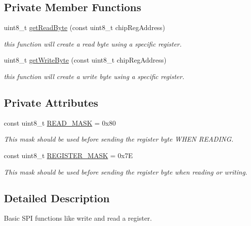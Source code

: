 \subsection*{Private Member Functions}
\begin{DoxyCompactItemize}
\item 
uint8\+\_\+t \mbox{\hyperlink{classspi_bus_a6e5f0193b056b4b58db49e1c6ce5d807}{get\+Read\+Byte}} (const uint8\+\_\+t chip\+Reg\+Address)
\begin{DoxyCompactList}\small\item\em this function will create a read byte using a specific register. \end{DoxyCompactList}\item 
uint8\+\_\+t \mbox{\hyperlink{classspi_bus_af09ae8625cbb1c5353e3777af6bf5ae3}{get\+Write\+Byte}} (const uint8\+\_\+t chip\+Reg\+Address)
\begin{DoxyCompactList}\small\item\em this function will create a write byte using a specific register. \end{DoxyCompactList}\end{DoxyCompactItemize}
\subsection*{Private Attributes}
\begin{DoxyCompactItemize}
\item 
const uint8\+\_\+t \mbox{\hyperlink{classspi_bus_a0dda31f7fa031ef8913e029d2eb4acf9}{R\+E\+A\+D\+\_\+\+M\+A\+SK}} = 0x80
\begin{DoxyCompactList}\small\item\em This mask should be used before sending the register byte W\+H\+EN R\+E\+A\+D\+I\+NG. \end{DoxyCompactList}\item 
const uint8\+\_\+t \mbox{\hyperlink{classspi_bus_acd898d08216428963563e20f033423b3}{R\+E\+G\+I\+S\+T\+E\+R\+\_\+\+M\+A\+SK}} = 0x7E
\begin{DoxyCompactList}\small\item\em This mask should be used before sending the register byte when reading or writing. \end{DoxyCompactList}\end{DoxyCompactItemize}


\subsection{Detailed Description}
Basic S\+PI functions like write and read a register. 


